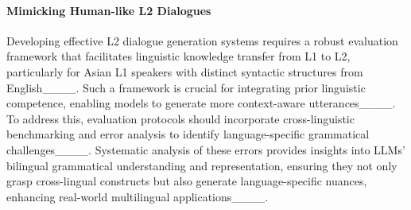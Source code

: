 \paragraph{Mimicking Human-like L2 Dialogues} 
Developing effective L2 dialogue generation systems requires a robust evaluation framework that facilitates linguistic knowledge transfer from L1 to L2, particularly for Asian L1 speakers with distinct syntactic structures from English____. Such a framework is crucial for integrating prior linguistic competence, enabling models to generate more context-aware utterances____. To address this, evaluation protocols should incorporate cross-linguistic benchmarking and error analysis to identify language-specific grammatical challenges____. Systematic analysis of these errors provides insights into LLMs’ bilingual grammatical understanding and representation, ensuring they not only grasp cross-lingual constructs but also generate language-specific nuances, enhancing real-world multilingual applications____.
